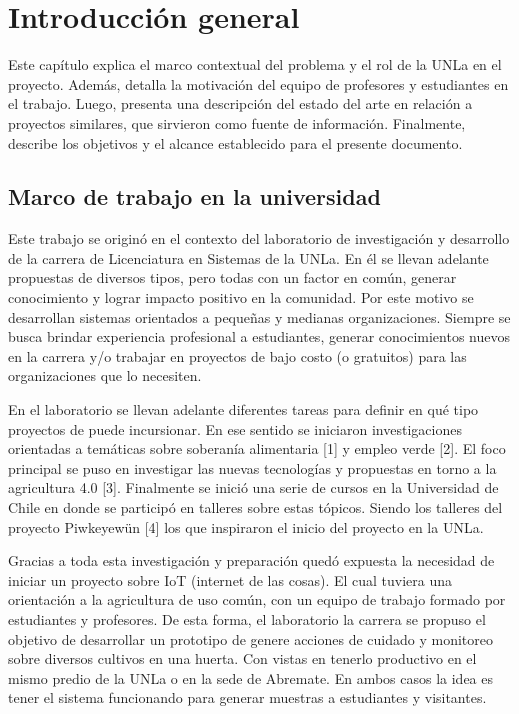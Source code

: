 \chapter{Introducción general} %

Este capítulo explica el marco contextual del problema y el rol de la UNLa en el proyecto. Además, detalla la motivación del equipo de profesores y estudiantes en el trabajo. Luego, presenta una descripción del estado del arte en relación a proyectos similares, que sirvieron como fuente de información. Finalmente, describe los objetivos y el alcance establecido para el presente documento.\\

\section{Marco de trabajo en la universidad}
Este trabajo se originó en el contexto del laboratorio de investigación y desarrollo de la carrera de Licenciatura en Sistemas de la UNLa. En él se llevan adelante propuestas de diversos tipos, pero todas con un factor en común, generar conocimiento y lograr impacto positivo en la comunidad. Por este motivo se desarrollan sistemas orientados a pequeñas y medianas organizaciones. Siempre se busca brindar experiencia profesional a estudiantes, generar conocimientos nuevos en la carrera y/o trabajar en proyectos de bajo costo (o gratuitos) para las organizaciones que lo necesiten.

En el laboratorio se llevan adelante diferentes tareas para definir en qué tipo proyectos de puede incursionar. En ese sentido se iniciaron investigaciones orientadas a temáticas sobre soberanía alimentaria [1] y empleo verde [2]. El foco principal se puso en investigar las nuevas tecnologías y propuestas en torno a la agricultura 4.0 [3]. Finalmente se inició una serie de cursos en la Universidad de Chile en donde se participó en talleres sobre estas tópicos. Siendo los talleres del proyecto Piwkeyewün [4] los que inspiraron el inicio del proyecto en la UNLa.

Gracias a toda esta investigación y preparación quedó expuesta la necesidad de iniciar un proyecto sobre IoT (internet de las cosas). El cual tuviera una orientación a la agricultura de uso común, con un equipo de trabajo formado por estudiantes y profesores. De esta forma, el laboratorio la carrera se propuso el objetivo de desarrollar un prototipo de genere acciones de cuidado y monitoreo sobre diversos cultivos en una huerta. Con vistas en tenerlo productivo en el mismo predio de la UNLa o en la sede de Abremate. En ambos casos la idea es tener el sistema funcionando para generar muestras a estudiantes y visitantes.\\

